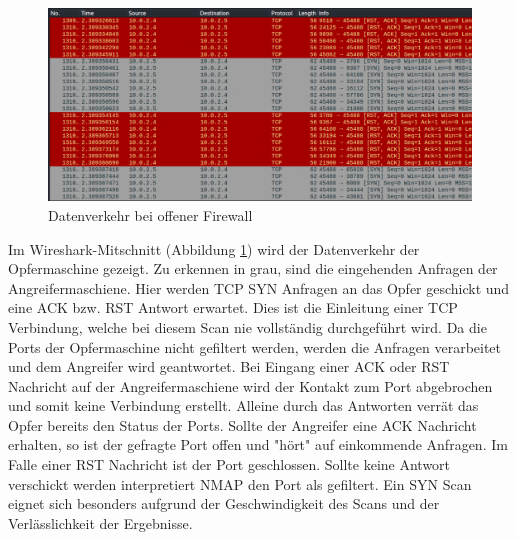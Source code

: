 \begin{figure}
	\includegraphics[width=\linewidth]{img/ws_firewall-open.png}
	\caption{Datenverkehr bei offener Firewall}
	\label{fig:ws_firewall_open}
\end{figure}

Im Wireshark-Mitschnitt (Abbildung \ref{fig:ws_firewall_open}) wird der Datenverkehr der Opfermaschine gezeigt. Zu erkennen in grau, sind die eingehenden Anfragen der Angreifermaschiene. Hier werden TCP SYN Anfragen an das Opfer geschickt und eine ACK bzw. RST Antwort erwartet. Dies ist die Einleitung einer TCP Verbindung, welche bei diesem Scan nie vollständig durchgeführt wird. Da die Ports der Opfermaschine nicht gefiltert werden, werden die Anfragen verarbeitet und dem Angreifer wird geantwortet. Bei Eingang einer ACK oder RST Nachricht auf der Angreifermaschiene wird der Kontakt zum Port abgebrochen und somit keine Verbindung erstellt. Alleine durch das Antworten verrät das Opfer bereits den Status der Ports. Sollte der Angreifer eine ACK Nachricht erhalten, so ist der gefragte Port offen und "hört" auf einkommende Anfragen. Im Falle einer RST Nachricht ist der Port geschlossen.
 Sollte keine Antwort verschickt werden interpretiert NMAP den Port als gefiltert. Ein SYN Scan eignet sich besonders aufgrund der Geschwindigkeit des Scans und der Verlässlichkeit der Ergebnisse.


